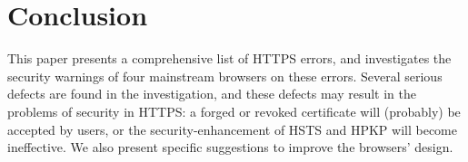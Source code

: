 \section{Conclusion}
This paper presents a comprehensive list of HTTPS errors,
 and investigates the security warnings of four mainstream browsers on these errors.
Several  serious defects are found in the investigation,
 and these defects may result in the problems of security in HTTPS:
a forged or revoked certificate will (probably) be accepted by users,
    or the security-enhancement of HSTS and HPKP will become ineffective.
We also present specific suggestions to improve the browsers' design.

